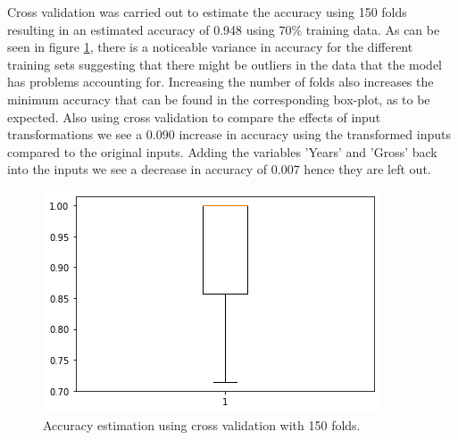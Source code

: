 \documentclass[../../project.tex]{subfiles}
\begin{document}
	Cross validation was carried out to estimate the accuracy using 150 folds resulting in an estimated accuracy of 0.948 using 70\% training data. As can be seen in figure \ref{fig:boxplotQDA}, there is a noticeable variance in accuracy for the different training sets suggesting that there might be outliers in the data that the model has problems accounting for. Increasing the number of folds also increases the minimum accuracy that can be found in the corresponding box-plot, as to be expected. Also using cross validation to compare the effects of input transformations we see a 0.090 increase in accuracy using the transformed inputs compared to the original inputs. Adding the variables 'Years' and 'Gross' back into the inputs we see a decrease in accuracy of 0.007 hence they are left out.
	\begin{figure}[h!]
		\centering
    	\includegraphics[scale=0.7]{project/tex/QDAboxplot.png}
		\caption{Accuracy estimation using cross validation with 150 folds.}
		\label{fig:boxplotQDA}
    \end{figure}
    
\end{document}
